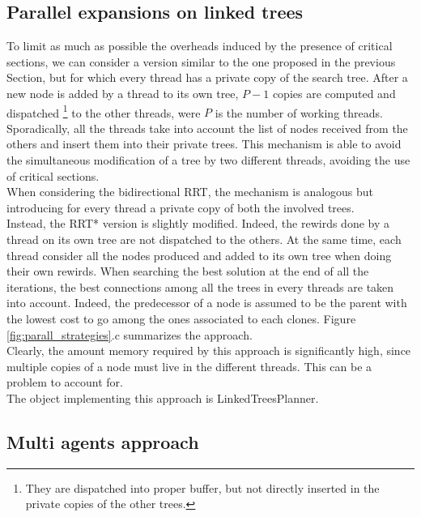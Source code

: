 \subsection{Parallel expansions on linked trees}
\label{sec:strtg_copied}

To limit as much as possible the overheads induced by the presence of critical sections, we can consider a version similar to the one proposed in the previous Section, but for which every thread has a private copy of the search tree. After a new node is added by a thread to its own tree, $P-1$ copies are computed and dispatched \footnote{They are dispatched into proper buffer, but not directly inserted in the private copies of the other trees.} to the other threads, were $P$ is the number of working threads.
Sporadically, all the threads take into account the list of nodes received from the others and insert them into their private trees. This mechanism is able to avoid the simultaneous modification of a tree by two different threads, avoiding the use of critical sections.
\\
When considering the bidirectional RRT, the mechanism is analogous but introducing for every thread a private
copy of both the involved trees. 
\\
Instead, the RRT* version is slightly modified. Indeed, the rewirds done by a thread on its own tree are not dispatched to the others.
At the same time, each thread consider all the nodes produced and added to its own tree when doing their own rewirds.
When searching the best solution at the end of all the iterations, the best connections among all the trees in every threads are taken into account. Indeed, the predecessor of a node is assumed to be the parent with the lowest cost to go among the ones associated to each clones. Figure \ref{fig:parall_strategies}.c summarizes the approach.
\\
Clearly, the amount memory required by this approach is significantly high, since multiple copies of a node must live in the different threads.
This can be a problem to account for.
\\
The object implementing this approach is LinkedTreesPlanner.

\subsection{Multi agents approach}
\label{sec:strtg_multi}

